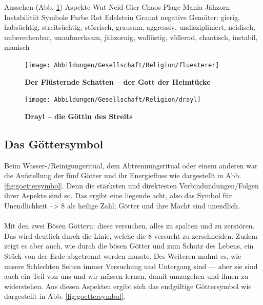 \begin{outline}
	\1 Aussehen (Abb. \ref{fig:drayl})
	\1 Aspekte
		\2 Wut
		\2 Neid
		\2 Gier
		\2 Chaos
	\1 Plage
		\2 Mania
		\2 Jähzorn
		\2 Instabilität
	\1 Symbole
		\2 Farbe Rot
		\2 Edelstein Granat
	\1 negative Gemüter: gierig,  habsüchtig,  streitsüchtig, störrisch, grausam, aggressiv, undiszipliniert, neidisch, unberechenbar, unaufmerksam, jähzornig, wollüstig, völlernd, 
	chaotisch, instabil, manisch
\end{outline}



\begin{figure}[tbh]
	\begin{minipage}{0.51\textwidth}
		\centering
		\vspace{8pt}
		\vspace{\baselineskip}
		\vspace{\baselineskip}
		\texttt{[image: Abbildungen/Gesellschaft/Religion/fluesterer]}
		\vspace{\baselineskip}
		\vspace{\baselineskip}
		\captionsetup{width=0.95\linewidth}
		\caption[Der Flüsternde Schatten -- Gott der Heimtücke]{\textbf{Der Flüsternde Schatten -- der Gott der Heimtücke}}
		\label{fig:fluesterer}
	\end{minipage}
	\hfill
	\begin{minipage}{0.48\textwidth}
		\centering
		\texttt{[image: Abbildungen/Gesellschaft/Religion/drayl]}
		\captionsetup{width=0.95\linewidth}
		\caption[Drayl -- Göttin des Streits]{\textbf{Drayl -- die Göttin des Streits}}
		\label{fig:drayl}
	\end{minipage}
\end{figure}



\newpage
\subsection{Das Göttersymbol} \label{sec:goettersymbol}
Beim Wasser-/Reinigungsritual, dem Abtrennungsritual oder einem anderen war die Aufstellung der fünf Götter und ihr Energiefluss wie dargestellt in Abb. \ref{fig:goettersymbol}. 
Denn die stärksten und direktesten Verbindundungen/Folgen ihrer Aspekte sind so. 
Das ergibt eine liegende acht, also das Symbol für Unendlichkeit --> 8 als heilige Zahl; 
Götter und ihre Macht sind unendlich.\\
\\
Mit den zwei Bösen Göttern: diese versuchen, alles zu spalten und zu zerstören. 
Das wird deutlich durch die Linie, welche die 8 versucht zu zerschneiden. 
Zudem zeigt es aber auch, wie durch die bösen Götter und zum Schutz des Lebens, ein Stück von der Erde abgetrennt werden musste. 
Des Weiteren mahnt es, wie unsere Schlechten Seiten immer Versuchung und Untergang sind — aber sie sind auch ein Teil von uns und wir müssen lernen, damit umzugehen und ihnen zu widerstehen. 
Aus diesen Aspekten ergibt sich das endgültige Göttersymbol wie dargestellt in Abb. \ref{fig:goettersymbol}.\\

